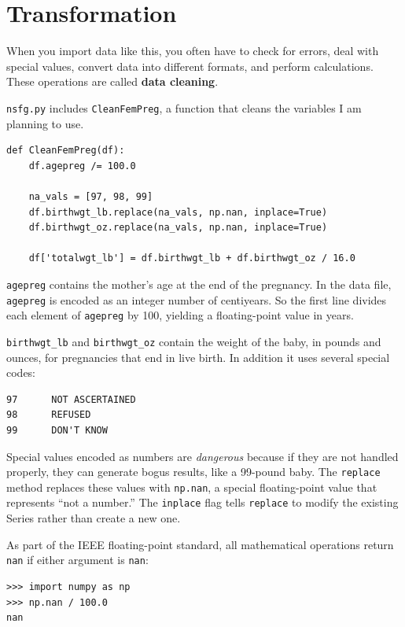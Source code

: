 \documentclass[12pt]{book}
\theoremstyle{exercise}
\begin{document}
\section{Transformation}%
\label{cleaning}

When you import data like this, you often have to check for errors,
deal with special values, convert data into different formats, and
perform calculations.  These operations are called {\bf data cleaning}.

{\tt nsfg.py} includes {\tt CleanFemPreg}, a function that cleans
the variables I am planning to use.

\begin{verbatim}
def CleanFemPreg(df):
    df.agepreg /= 100.0

    na_vals = [97, 98, 99]
    df.birthwgt_lb.replace(na_vals, np.nan, inplace=True)
    df.birthwgt_oz.replace(na_vals, np.nan, inplace=True)

    df['totalwgt_lb'] = df.birthwgt_lb + df.birthwgt_oz / 16.0    
\end{verbatim}

{\tt agepreg} contains the mother's age at the end of the
pregnancy.  In the data file, {\tt agepreg} is encoded as an integer
number of centiyears.  So the first line divides each element
of {\tt agepreg} by 100, yielding a floating-point value in
years.

\verb"birthwgt_lb" and \verb"birthwgt_oz" contain the weight of the
baby, in pounds and ounces, for pregnancies that end in live birth.
In addition it uses several special codes:

\begin{verbatim}
97      NOT ASCERTAINED
98      REFUSED
99      DON'T KNOW
\end{verbatim}

Special values encoded as numbers are {\em dangerous\/} because if they
are not handled properly, they can generate bogus results, like
a 99-pound baby.  The {\tt replace} method replaces these values with
{\tt np.nan}, a special floating-point value that represents ``not a
number.''  The {\tt inplace} flag tells {\tt replace} to modify the
existing Series rather than create a new one.%

As part of the IEEE floating-point standard, all mathematical
operations return {\tt nan} if either argument is {\tt nan}:

\begin{verbatim}
>>> import numpy as np
>>> np.nan / 100.0
nan
\end{verbatim}
\end{document}
